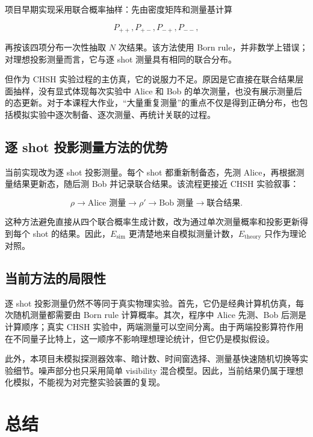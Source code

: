 \documentclass{zjureport}
\begin{document}
项目早期实现采用联合概率抽样：先由密度矩阵和测量基计算

\[
P_{++},P_{+-},P_{-+},P_{--},
\]

再按该四项分布一次性抽取 \(N\) 次结果。该方法使用 Born rule，并非数学上错误；对理想投影测量而言，它与逐 shot 测量具有相同的联合分布。

但作为 CHSH 实验过程的主仿真，它的说服力不足。原因是它直接在联合结果层面抽样，没有显式体现每次实验中 Alice 和 Bob 的单次测量，也没有展示测量后的态更新。对于本课程大作业，``大量重复测量''的重点不仅是得到正确分布，也包括模拟实验中逐次制备、逐次测量、再统计关联的过程。

\subsection{逐 shot 投影测量方法的优势}\label{ux9010-shot-ux6295ux5f71ux6d4bux91cfux65b9ux6cd5ux7684ux4f18ux52bf}

当前实现改为逐 shot 投影测量。每个 shot 都重新制备态，先测 Alice，再根据测量结果更新态，随后测 Bob 并记录联合结果。该流程更接近 CHSH 实验叙事：

\[
\rho
\rightarrow
\text{Alice 测量}
\rightarrow
\rho'
\rightarrow
\text{Bob 测量}
\rightarrow
\text{联合结果}.
\]

这种方法避免直接从四个联合概率生成计数，改为通过单次测量概率和投影更新得到每个 shot 的结果。因此，\(E_{\mathrm{sim}}\) 更清楚地来自模拟测量计数，\(E_{\mathrm{theory}}\) 只作为理论对照。

\subsection{当前方法的局限性}\label{ux5f53ux524dux65b9ux6cd5ux7684ux5c40ux9650ux6027}

逐 shot 投影测量仍然不等同于真实物理实验。首先，它仍是经典计算机仿真，每次随机测量都需要由 Born rule 计算概率。其次，程序中 Alice 先测、Bob 后测是计算顺序；真实 CHSH 实验中，两端测量可以空间分离。由于两端投影算符作用在不同量子比特上，这一顺序不影响理想理论统计，但它仍是模拟假设。

此外，本项目未模拟探测器效率、暗计数、时间窗选择、测量基快速随机切换等实验细节。噪声部分也只采用简单 visibility 混合模型。因此，当前结果仍属于理想化模拟，不能视为对完整实验装置的复现。

\section{总结}\label{ux603bux7ed3}
\end{document}

